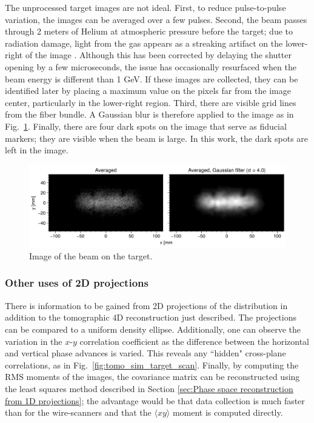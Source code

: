 The unprocessed target images are not ideal. First, to reduce pulse-to-pulse variation, the images can be averaged over a few pulses. Second, the beam passes through 2 meters of Helium at atmospheric pressure before the target; due to radiation damage, light from the gas appears as a streaking artifact on the lower-right of the image \cite{Blokland2010}. Although this has been corrected by delaying the shutter opening by a few microseconds, the issue has occasionally resurfaced when the beam energy is different than 1 GeV. If these images are collected, they can be identified later by placing a maximum value on the pixels far from the image center, particularly in the lower-right region. Third, there are visible grid lines from the fiber bundle. A Gaussian blur is therefore applied to the image as in Fig.~\ref{fig:target_image}. Finally, there are four dark spots on the image that serve as fiducial markers; they are visible when the beam is large. In this work, the dark spots are left in the image.
%
\begin{figure}[!p]
    \centering
    \vspace*{5cm}
    \includegraphics[width=1.0\textwidth]{Images/chapter4/target_image.png}
    \caption{Image of the beam on the target.}
    \label{fig:target_image}
     \vspace*{5cm}
\end{figure}
%


\subsubsection{Other uses of 2D projections}

There is information to be gained from 2D projections of the distribution in addition to the tomographic 4D reconstruction just described. The projections can be compared to a uniform density ellipse. Additionally, one can observe the variation in the $x$-$y$ correlation coefficient as the difference between the horizontal and vertical phase advances is varied. This reveals any ``hidden" cross-plane correlations, as in Fig.~\ref{fig:tomo_sim_target_scan}. Finally, by computing the RMS moments of the images, the covariance matrix can be reconstructed using the least squares method described in Section \ref{sec:Phase space reconstruction from 1D projections}; the advantage would be that data collection is much faster than for the wire-scanners and that the $\langle xy \rangle$ moment is computed directly.
